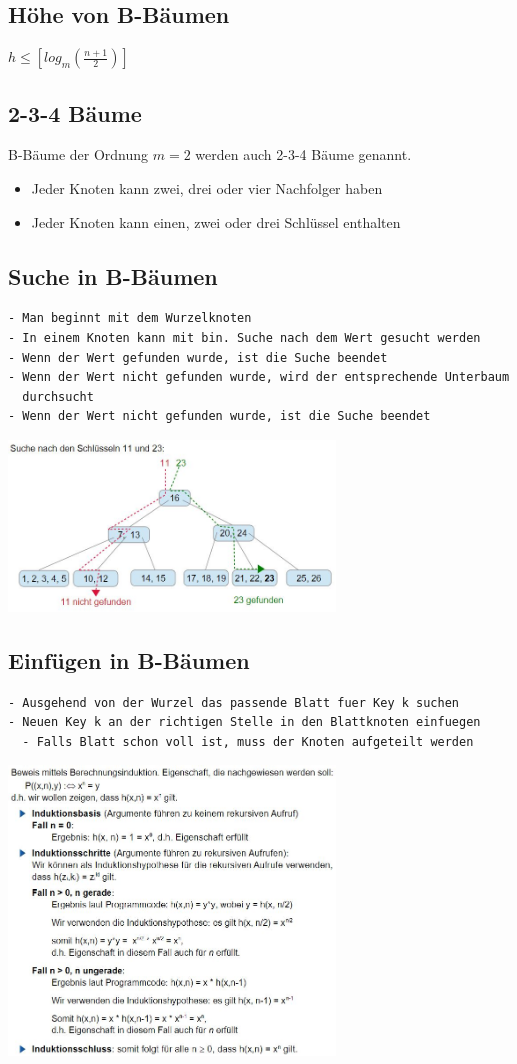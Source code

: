 \documentclass{scrreprt}
\begin{document}
\subsection{Höhe von B-Bäumen}
$h \leq [log_m(\frac{n+1}{2})]$
\subsection{2-3-4 Bäume}
B-Bäume der Ordnung $m=2$ werden auch 2-3-4 Bäume genannt.
\begin{itemize}
  \item Jeder Knoten kann zwei, drei oder vier Nachfolger haben
  \item Jeder Knoten kann einen, zwei oder drei Schlüssel enthalten
\end{itemize}
\subsection{Suche in B-Bäumen}
\begin{lstlisting}
- Man beginnt mit dem Wurzelknoten
- In einem Knoten kann mit bin. Suche nach dem Wert gesucht werden
- Wenn der Wert gefunden wurde, ist die Suche beendet
- Wenn der Wert nicht gefunden wurde, wird der entsprechende Unterbaum
  durchsucht
- Wenn der Wert nicht gefunden wurde, ist die Suche beendet
\end{lstlisting}
\includegraphics[width=0.65\textwidth]{graphics/B-Baum-Suche}
\subsection{Einfügen in B-Bäumen}
\begin{lstlisting}
- Ausgehend von der Wurzel das passende Blatt fuer Key k suchen
- Neuen Key k an der richtigen Stelle in den Blattknoten einfuegen
  - Falls Blatt schon voll ist, muss der Knoten aufgeteilt werden
\end{lstlisting}
\includegraphics[width=0.65\textwidth]{graphics/Splitten}
\end{document}
